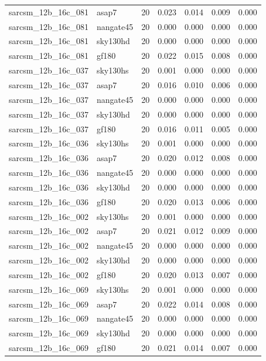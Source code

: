 \begin{tabular}{llrrrrr}
sarcsm\_12b\_16c\_081 & asap7 & 20 & 0.023 & 0.014 & 0.009 & 0.000 \\
sarcsm\_12b\_16c\_081 & nangate45 & 20 & 0.000 & 0.000 & 0.000 & 0.000 \\
sarcsm\_12b\_16c\_081 & sky130hd & 20 & 0.000 & 0.000 & 0.000 & 0.000 \\
sarcsm\_12b\_16c\_081 & gf180 & 20 & 0.022 & 0.015 & 0.008 & 0.000 \\
sarcsm\_12b\_16c\_037 & sky130hs & 20 & 0.001 & 0.000 & 0.000 & 0.000 \\
sarcsm\_12b\_16c\_037 & asap7 & 20 & 0.016 & 0.010 & 0.006 & 0.000 \\
sarcsm\_12b\_16c\_037 & nangate45 & 20 & 0.000 & 0.000 & 0.000 & 0.000 \\
sarcsm\_12b\_16c\_037 & sky130hd & 20 & 0.000 & 0.000 & 0.000 & 0.000 \\
sarcsm\_12b\_16c\_037 & gf180 & 20 & 0.016 & 0.011 & 0.005 & 0.000 \\
sarcsm\_12b\_16c\_036 & sky130hs & 20 & 0.001 & 0.000 & 0.000 & 0.000 \\
sarcsm\_12b\_16c\_036 & asap7 & 20 & 0.020 & 0.012 & 0.008 & 0.000 \\
sarcsm\_12b\_16c\_036 & nangate45 & 20 & 0.000 & 0.000 & 0.000 & 0.000 \\
sarcsm\_12b\_16c\_036 & sky130hd & 20 & 0.000 & 0.000 & 0.000 & 0.000 \\
sarcsm\_12b\_16c\_036 & gf180 & 20 & 0.020 & 0.013 & 0.006 & 0.000 \\
sarcsm\_12b\_16c\_002 & sky130hs & 20 & 0.001 & 0.000 & 0.000 & 0.000 \\
sarcsm\_12b\_16c\_002 & asap7 & 20 & 0.021 & 0.012 & 0.009 & 0.000 \\
sarcsm\_12b\_16c\_002 & nangate45 & 20 & 0.000 & 0.000 & 0.000 & 0.000 \\
sarcsm\_12b\_16c\_002 & sky130hd & 20 & 0.000 & 0.000 & 0.000 & 0.000 \\
sarcsm\_12b\_16c\_002 & gf180 & 20 & 0.020 & 0.013 & 0.007 & 0.000 \\
sarcsm\_12b\_16c\_069 & sky130hs & 20 & 0.001 & 0.000 & 0.000 & 0.000 \\
sarcsm\_12b\_16c\_069 & asap7 & 20 & 0.022 & 0.014 & 0.008 & 0.000 \\
sarcsm\_12b\_16c\_069 & nangate45 & 20 & 0.000 & 0.000 & 0.000 & 0.000 \\
sarcsm\_12b\_16c\_069 & sky130hd & 20 & 0.000 & 0.000 & 0.000 & 0.000 \\
sarcsm\_12b\_16c\_069 & gf180 & 20 & 0.021 & 0.014 & 0.007 & 0.000 \\

\end{tabular}

